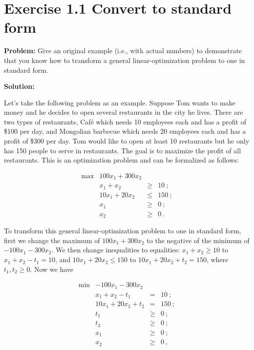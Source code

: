 \section{Exercise 1.1 Convert to standard form}
\textbf{Problem:} Give an original example (i.e., with actual numbers) to demonstrate that you know how to transform a general linear-optimization problem to one in standard form.

\textbf{Solution:}

Let's take the following problem as an example. Suppose Tom wants to make money and he decides to open several restaurants in the city he lives. There are two types of restaurants, Caf\'{e} which needs 10 employees each and has a profit of \$100 per day, and Mongolian barbecue which needs 20 employees each and has a profit of \$300 per day. Tom would like to open at least 10 restaurants but he only has 150 people to serve in restaurants. The goal is to maximize the profit of all restaurants. This is an optimization problem and can be formalized as follows:

\[
\begin{array}{rrcl}
 \max & 100x_1 + 300x_2  &      &   \\
      &  x_1 + x_2  &   \geq  & 10~; \\
      &  10x_1 + 20x_2 & \leq & 150~; \\
      &   x_1  & \geq & 0 ~; \\
      &   x_2  & \geq & 0~.
\end{array}
\]

To transform this general linear-optimization problem to one in standard form, first we change the maximum of $100x_1 + 300x_2$ to the negative of the minimum of $-100x_1 - 300x_2$. We then change inequalities to equalities: $ x_1 + x_2 \geq 10$ to $ x_1 + x_2 - t_1 = 10$, and $10x_1 + 20x_2 \leq 150$ to $10x_1 + 20x_2 + t_2  = 150 $, where $t_1,t_2\geq 0$. Now we have

\[
\begin{array}{rrcl}
 \min & -100x_1 - 300x_2  &      &   \\
      &  x_1 + x_2 - t_1  &   =  & 10~; \\
      &  10x_1 + 20x_2 + t_2 & = & 150~; \\
      &   t_1  & \geq & 0~; \\
      &   t_2  & \geq & 0~; \\
      &   x_1  & \geq & 0 ~; \\
      &   x_2  & \geq & 0~,
\end{array}
\]

